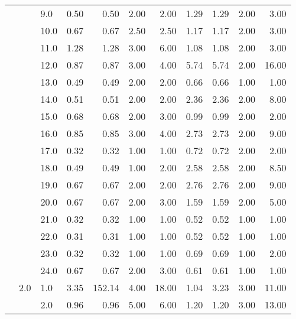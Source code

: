 \begin{tabular}{lllrrrrrrrr}
       &     & 9.0  &       0.50 &      0.50 &  2.00 &   2.00 &       1.29 &      1.29 &  2.00 &   3.00 \\
       &     & 10.0 &       0.67 &      0.67 &  2.50 &   2.50 &       1.17 &      1.17 &  2.00 &   3.00 \\
       &     & 11.0 &       1.28 &      1.28 &  3.00 &   6.00 &       1.08 &      1.08 &  2.00 &   3.00 \\
       &     & 12.0 &       0.87 &      0.87 &  3.00 &   4.00 &       5.74 &      5.74 &  2.00 &  16.00 \\
       &     & 13.0 &       0.49 &      0.49 &  2.00 &   2.00 &       0.66 &      0.66 &  1.00 &   1.00 \\
       &     & 14.0 &       0.51 &      0.51 &  2.00 &   2.00 &       2.36 &      2.36 &  2.00 &   8.00 \\
       &     & 15.0 &       0.68 &      0.68 &  2.00 &   3.00 &       0.99 &      0.99 &  2.00 &   2.00 \\
       &     & 16.0 &       0.85 &      0.85 &  3.00 &   4.00 &       2.73 &      2.73 &  2.00 &   9.00 \\
       &     & 17.0 &       0.32 &      0.32 &  1.00 &   1.00 &       0.72 &      0.72 &  2.00 &   2.00 \\
       &     & 18.0 &       0.49 &      0.49 &  1.00 &   2.00 &       2.58 &      2.58 &  2.00 &   8.50 \\
       &     & 19.0 &       0.67 &      0.67 &  2.00 &   2.00 &       2.76 &      2.76 &  2.00 &   9.00 \\
       &     & 20.0 &       0.67 &      0.67 &  2.00 &   3.00 &       1.59 &      1.59 &  2.00 &   5.00 \\
       &     & 21.0 &       0.32 &      0.32 &  1.00 &   1.00 &       0.52 &      0.52 &  1.00 &   1.00 \\
       &     & 22.0 &       0.31 &      0.31 &  1.00 &   1.00 &       0.52 &      0.52 &  1.00 &   1.00 \\
       &     & 23.0 &       0.32 &      0.32 &  1.00 &   1.00 &       0.69 &      0.69 &  1.00 &   2.00 \\
       &     & 24.0 &       0.67 &      0.67 &  2.00 &   3.00 &       0.61 &      0.61 &  1.00 &   1.00 \\
       & 2.0 & 1.0  &       3.35 &    152.14 &  4.00 &  18.00 &       1.04 &      3.23 &  3.00 &  11.00 \\
       &     & 2.0  &       0.96 &      0.96 &  5.00 &   6.00 &       1.20 &      1.20 &  3.00 &  13.00 \\

\end{tabular}
